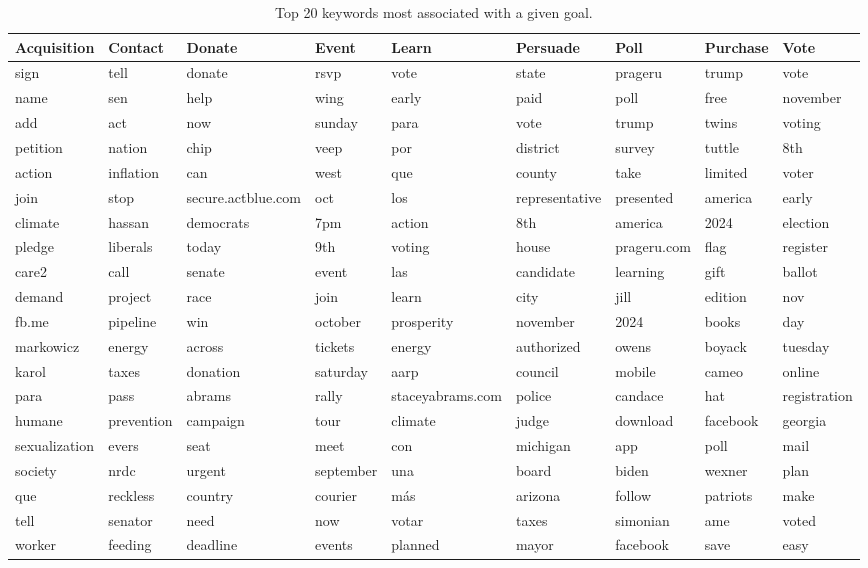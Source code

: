 \begin{table}[ht]
\centering
\begin{tabular}{lllllllll}
  \hline
Acquisition & Contact & Donate & Event & Learn & Persuade & Poll & Purchase & Vote \\ 
  \hline
sign & tell & donate & rsvp & vote & state & prageru & trump & vote \\ 
  name & sen & help & wing & early & paid & poll & free & november \\ 
  add & act & now & sunday & para & vote & trump & twins & voting \\ 
  petition & nation & chip & veep & por & district & survey & tuttle & 8th \\ 
  action & inflation & can & west & que & county & take & limited & voter \\ 
  join & stop & secure.actblue.com & oct & los & representative & presented & america & early \\ 
  climate & hassan & democrats & 7pm & action & 8th & america & 2024 & election \\ 
  pledge & liberals & today & 9th & voting & house & prageru.com & flag & register \\ 
  care2 & call & senate & event & las & candidate & learning & gift & ballot \\ 
  demand & project & race & join & learn & city & jill & edition & nov \\ 
  fb.me & pipeline & win & october & prosperity & november & 2024 & books & day \\ 
  markowicz & energy & across & tickets & energy & authorized & owens & boyack & tuesday \\ 
  karol & taxes & donation & saturday & aarp & council & mobile & cameo & online \\ 
  para & pass & abrams & rally & staceyabrams.com & police & candace & hat & registration \\ 
  humane & prevention & campaign & tour & climate & judge & download & facebook & georgia \\ 
  sexualization & evers & seat & meet & con & michigan & app & poll & mail \\ 
  society & nrdc & urgent & september & una & board & biden & wexner & plan \\ 
  que & reckless & country & courier & más & arizona & follow & patriots & make \\ 
  tell & senator & need & now & votar & taxes & simonian & ame & voted \\ 
  worker & feeding & deadline & events & planned & mayor & facebook & save & easy \\ 
   \hline
\end{tabular}
\caption{Top 20 keywords most associated with a given goal.} 
\label{tab:fightin_words}
\end{table}
